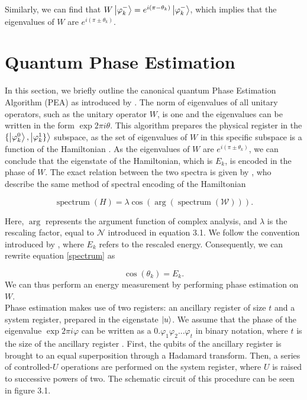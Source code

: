 Similarly, we can find that $W \left\vert{\varphi^-_k}\right\rangle = e^{i\left(\pi-\theta_{k}\right)} \left\vert{\varphi^-_k}\right\rangle$, which implies that the eigenvalues of $W$ are $e^{i\left(\pi \pm \theta_{k}\right)}$.

\section{Quantum Phase Estimation}
\label{sec:pea}
In this section, we briefly outline the canonical quantum Phase Estimation Algorithm (PEA) as introduced by \textcite{nielsen}. The norm of eigenvalues of all unitary operators, such as the unitary operator $W$, is one and the eigenvalues can be written in the form $\exp{2\pi i \theta}$. This algorithm prepares the physical register in the $\{\left\vert{\varphi_k^0}\right\rangle, \left\vert{\varphi_k^1\}}\right\rangle$ subspace, as the set of eigenvalues of $W$ in this specific subspace is a function of the Hamiltonian \cite{poulin}. As the eigenvalues of $W$ are $e^{i\left(\pi \pm \theta_{k}\right)}$, we can conclude that the eigenstate of the Hamiltonian, which is $E_k$, is encoded in the phase of $W$. The exact relation between the two spectra is given by \textcite{Babbush_2018}, who describe the same method of spectral encoding of the Hamiltonian

\begin{equation}
\label{spectrum}
\operatorname{spectrum}(H)=\lambda \cos (\arg (\operatorname{spectrum}(\mathcal{W}))).
\end{equation}

Here, $\arg$ represents the argument function of complex analysis, and $\lambda$ is the rescaling factor, equal to $\mathcal{N}$ introduced in equation 3.1. We follow the convention introduced by \textcite{poulin}, where $E_k$ refers to the rescaled energy. Consequently, we can rewrite equation \ref{spectrum} as

\begin{equation}
\cos(\theta_k) = E_k.
\end{equation}
We can thus perform an energy measurement by performing phase estimation on $W$.\\

Phase estimation makes use of two registers: an ancillary register of size $t$ and a system register, prepared in the eigenstate $\left\vert{u}\right\rangle$. We assume that the phase of the eigenvalue $\exp{2\pi i \varphi}$ can be written as a $0.\varphi_1 \varphi_2 ... \varphi_t$ in binary notation, where $t$ is the size of the ancillary register \cite{nielsen}. First, the qubits of the ancillary register is brought to an equal superposition through a Hadamard transform. Then, a series of controlled-$U$ operations are performed on the system register, where $U$ is raised to successive powers of two. The schematic circuit of this procedure can be seen in figure 3.1.

